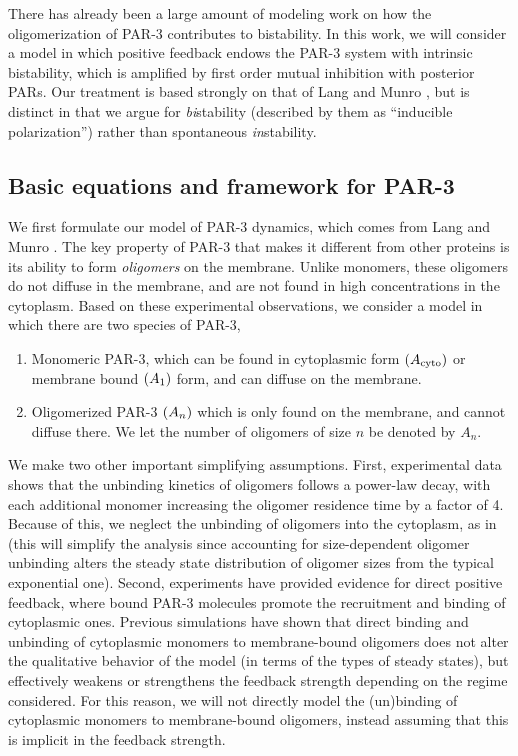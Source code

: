 \documentclass[11pt]{article}
\newcommand{\6}[1]{#1_{\text{6}}}
\newcommand{\3}[1]{#1_{\text{3}}}
\begin{document}
There has already been a large amount of modeling work \cite{dawes20113, lang2022oligomerization} on how the oligomerization of PAR-3 contributes to bistability. In this work, we will consider a model in which positive feedback endows the PAR-3 system with intrinsic bistability, which is amplified by first order mutual inhibition with posterior PARs. Our treatment is based strongly on that of Lang and Munro \cite{lang2022oligomerization}, but is distinct in that we argue for \emph{bi}stability (described by them as ``inducible polarization'') rather than spontaneous \emph{in}stability. %

\subsection{Basic equations and framework for PAR-3 \label{sec:Par3}}
We first formulate our model of PAR-3 dynamics, which comes from Lang and Munro \cite{lang2022oligomerization}. The key property of PAR-3 that makes it different from other proteins is its ability to form \emph{oligomers} on the membrane. Unlike monomers, these oligomers do not diffuse in the membrane, and are not found in high concentrations in the cytoplasm. Based on these experimental observations, we consider a model in which there are two species of PAR-3, 
\begin{enumerate}
\item Monomeric PAR-3, which can be found in cytoplasmic form $(A_\text{cyto})$ or membrane bound $(A_1)$ form, and can diffuse on the membrane.
\item Oligomerized PAR-3 $(A_n)$ which is only found on the membrane, and cannot diffuse there. We let the number of oligomers of size $n$ be denoted by $A_n$. 
\end{enumerate}
We make two other important simplifying assumptions. First, experimental data shows that the unbinding kinetics of oligomers follows a power-law decay, with each additional monomer increasing the oligomer residence time by a factor of 4. Because of this, we neglect the unbinding of oligomers into the cytoplasm, as in \cite{lang2022oligomerization} (this will simplify the analysis since accounting for size-dependent oligomer unbinding alters the steady state distribution of oligomer sizes from the typical exponential one). Second, experiments have provided evidence for direct positive feedback, where bound PAR-3 molecules promote the recruitment and binding of cytoplasmic ones. Previous simulations \cite{lang2022oligomerization} have shown that direct binding and unbinding of cytoplasmic monomers to membrane-bound oligomers does not alter the qualitative behavior of the model (in terms of the types of steady states), but effectively weakens or strengthens the feedback strength depending on the regime considered. For this reason, we will not directly model the (un)binding of cytoplasmic monomers to membrane-bound oligomers, instead assuming that this is implicit in the feedback strength.
\end{document}
